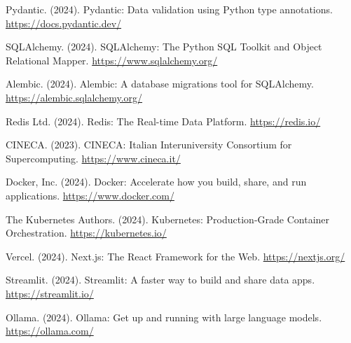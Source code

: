 Pydantic. (2024). Pydantic: Data validation using Python type annotations. \url{https://docs.pydantic.dev/}

SQLAlchemy. (2024). SQLAlchemy: The Python SQL Toolkit and Object Relational Mapper. \url{https://www.sqlalchemy.org/}

Alembic. (2024). Alembic: A database migrations tool for SQLAlchemy. \url{https://alembic.sqlalchemy.org/}

Redis Ltd. (2024). Redis: The Real-time Data Platform. \url{https://redis.io/}


CINECA. (2023). CINECA: Italian Interuniversity Consortium for Supercomputing. \url{https://www.cineca.it/}


Docker, Inc. (2024). Docker: Accelerate how you build, share, and run applications. \url{https://www.docker.com/}

The Kubernetes Authors. (2024). Kubernetes: Production-Grade Container Orchestration. \url{https://kubernetes.io/}


Vercel. (2024). Next.js: The React Framework for the Web. \url{https://nextjs.org/}

Streamlit. (2024). Streamlit: A faster way to build and share data apps. \url{https://streamlit.io/}


Ollama. (2024). Ollama: Get up and running with large language models. \url{https://ollama.com/}


